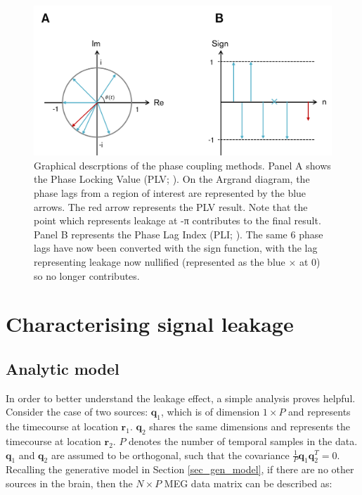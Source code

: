\begin{figure}
	\begin{center}
		\includegraphics[width=\linewidth]{./images/chapter3/phase.png}\caption{Graphical descrptions of the phase coupling methods. Panel A shows the Phase Locking Value (PLV; \citealp{Lachaux1999}). On the Argrand diagram, the phase lags from a region of interest are represented by the blue arrows. The red arrow represents the PLV result. Note that the point which represents leakage at -π contributes to the final result. Panel B represents the Phase Lag Index (PLI; \citealp{Stam2007}). The same 6 phase lags have now been converted with the sign function, with the lag representing leakage now nullified (represented as the blue $\times$ at 0) so no longer contributes.}\label{fig_phase}
	\end{center}
\end{figure}

\section{Characterising signal leakage}\label{sec_signal_leakage}
\subsection{Analytic model}
In order to better understand the leakage effect, a simple analysis proves helpful. Consider the case of two sources: $\mathbf{q}_1$, which is of dimension $1 \times P$ and represents the timecourse at location $\mathbf{r}_1$. $\mathbf{q}_2$ shares the same dimensions and represents the timecourse at location $\mathbf{r}_2$. $P$ denotes the number of temporal samples in the data. $\mathbf{q}_1$ and $\mathbf{q}_2$ are assumed to be orthogonal, such that the covariance $\tfrac{1}{P}\mathbf{q}_1\mathbf{q}_2^T = 0$. Recalling the generative model in Section \ref{sec_gen_model}, if there are no other sources in the brain, then the $N \times P$ MEG data matrix can be described as:

